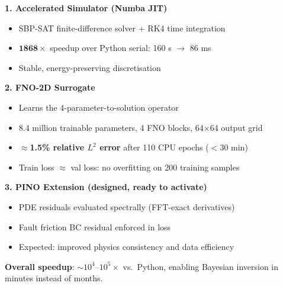 \documentclass[12pt, a4paper]{article}
\theoremstyle{definition}
\begin{document}
\begin{tcolorbox}[highlight=mygreen, title=What We Built and What We Achieved]
  \textbf{1. Accelerated Simulator (Numba JIT)}
  \begin{itemize}
    \item SBP-SAT finite-difference solver + RK4 time integration
    \item $\bm{1868\times}$ speedup over Python serial: 160 s $\to$ 86 ms
    \item Stable, energy-preserving discretisation
  \end{itemize}
  \vspace{4pt}
  \textbf{2. FNO-2D Surrogate}
  \begin{itemize}
    \item Learns the 4-parameter-to-solution operator
    \item 8.4 million trainable parameters, 4 FNO blocks, 64$\times$64 output grid
    \item \textbf{$\approx$1.5\% relative $L^2$ error} after 110 CPU epochs ($<$30 min)
    \item Train loss $\approx$ val loss: no overfitting on 200 training samples
  \end{itemize}
  \vspace{4pt}
  \textbf{3. PINO Extension (designed, ready to activate)}
  \begin{itemize}
    \item PDE residuals evaluated spectrally (FFT-exact derivatives)
    \item Fault friction BC residual enforced in loss
    \item Expected: improved physics consistency and data efficiency
  \end{itemize}
  \vspace{4pt}
  \textbf{Overall speedup}: $\sim$$10^4$–$10^5\times$ vs.\ Python, enabling
  Bayesian inversion in minutes instead of months.
\end{tcolorbox}

\vspace{12pt}
\begin{center}
\end{center}
\end{document}
